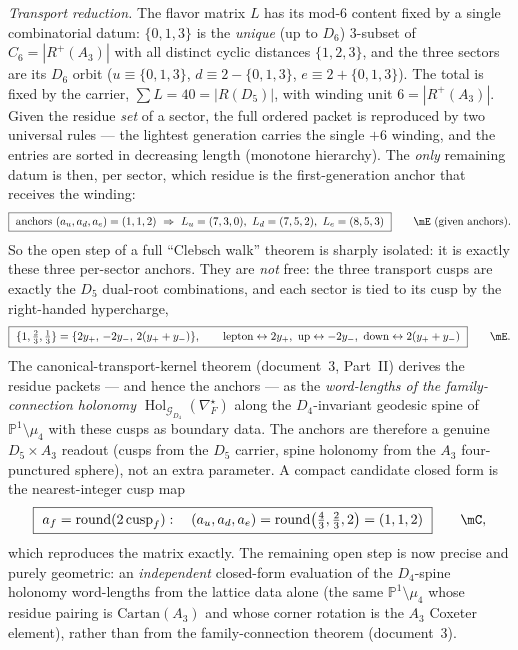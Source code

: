 \documentclass[11pt,a4paper]{article}
\theoremstyle{definition}
\begin{document}
\noindent\emph{Transport reduction.} The flavor matrix $L$ has its mod-$6$ content fixed by a single
combinatorial datum: $\{0,1,3\}$ is the \emph{unique} (up to $D_6$) $3$-subset of $C_6=|R^+(A_3)|$ with
all distinct cyclic distances $\{1,2,3\}$, and the three sectors are its $D_6$ orbit
($u\!\equiv\!\{0,1,3\}$, $d\!\equiv\!2{-}\{0,1,3\}$, $e\!\equiv\!2{+}\{0,1,3\}$). The total is fixed by
the carrier, $\sum L=40=|R(D_5)|$, with winding unit $6=|R^+(A_3)|$. Given the residue \emph{set} of a
sector, the full ordered packet is reproduced by two universal rules --- the lightest generation
carries the single $+6$ winding, and the entries are sorted in decreasing length (monotone hierarchy).
The \emph{only} remaining datum is then, per sector, which residue is the first-generation anchor that
receives the winding:
\begin{equation}
  \boxed{\ \text{anchors}\ (a_u,a_d,a_e)=(1,1,2)\ \Rightarrow\
  L_u=(7,3,0),\ L_d=(7,5,2),\ L_e=(8,5,3)\ }\qquad\mE\ (\text{given anchors}) .
\end{equation}
So the open step of a full ``Clebsch walk'' theorem is sharply isolated: it is exactly these three
per-sector anchors. They are \emph{not} free: the three transport cusps are exactly the $D_5$
dual-root combinations, and each sector is tied to its cusp by the right-handed hypercharge,
\begin{equation}
  \boxed{\ \{1,\tfrac23,\tfrac13\}=\{2y_+,\,-2y_-,\,2(y_++y_-)\},\qquad
  \text{lepton}\leftrightarrow 2y_+,\ \text{up}\leftrightarrow -2y_-,\ \text{down}\leftrightarrow 2(y_++y_-)\ }\qquad\mE .
\end{equation}
The canonical-transport-kernel theorem (document~3, Part~II) derives the residue packets --- and hence the anchors ---
as the \emph{word-lengths of the family-connection holonomy} $\operatorname{Hol}_{\mathcal G_{D_4}}(\nabla_F^\star)$
along the $D_4$-invariant geodesic spine of $\mathbb P^1\setminus\mu_4$ with these cusps as boundary
data. The anchors are therefore a genuine $D_5\times A_3$ readout (cusps from the $D_5$ carrier, spine
holonomy from the $A_3$ four-punctured sphere), not an extra parameter. A compact candidate closed form
is the nearest-integer cusp map
\begin{equation}
  \boxed{\ a_f=\operatorname{round}(2\,\mathrm{cusp}_f):\quad (a_u,a_d,a_e)=\operatorname{round}\bigl(\tfrac43,\tfrac23,2\bigr)=(1,1,2)\ }\qquad\mC ,
\end{equation}
which reproduces the matrix exactly. The remaining open step is now precise and purely geometric:
an \emph{independent} closed-form evaluation of the $D_4$-spine holonomy word-lengths from the lattice
data alone (the same $\mathbb P^1\setminus\mu_4$ whose residue pairing is $\mathrm{Cartan}(A_3)$ and
whose corner rotation is the $A_3$ Coxeter element), rather than from the family-connection
theorem (document~3).
\end{document}
